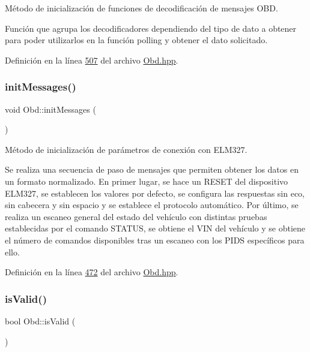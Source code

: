 Método de inicialización de funciones de decodificación de mensajes O\+BD. 

Función que agrupa los decodificadores dependiendo del tipo de dato a obtener para poder utilizarlos en la función polling y obtener el dato solicitado. 

Definición en la línea \hyperlink{Obd_8hpp_source_l00507}{507} del archivo \hyperlink{Obd_8hpp_source}{Obd.\+hpp}.

\mbox{\label{classObd_a5091314ed8068800cce40e7a74a3731e}} 
\subsubsection{\texorpdfstring{init\+Messages()}{initMessages()}}
{\footnotesize\ttfamily void Obd\+::init\+Messages (\begin{DoxyParamCaption}{ }\end{DoxyParamCaption})\hspace{0.3cm}{\ttfamily [inline]}}



Método de inicialización de parámetros de conexión con E\+L\+M327. 

Se realiza una secuencia de paso de mensajes que permiten obtener los datos en un formato normalizado. En primer lugar, se hace un R\+E\+S\+ET del dispositivo E\+L\+M327, se establecen los valores por defecto, se configura las respuestas sin eco, sin cabecera y sin espacio y se establece el protocolo automático. Por último, se realiza un escaneo general del estado del vehículo con distintas pruebas establecidas por el comando S\+T\+A\+T\+US, se obtiene el V\+IN del vehículo y se obtiene el número de comandos disponibles tras un escaneo con los P\+I\+DS específicos para ello. 

Definición en la línea \hyperlink{Obd_8hpp_source_l00472}{472} del archivo \hyperlink{Obd_8hpp_source}{Obd.\+hpp}.

\mbox{\label{classObd_ae28b765bb787467f929eae932133d2aa}} 
\subsubsection{\texorpdfstring{is\+Valid()}{isValid()}}
{\footnotesize\ttfamily bool Obd\+::is\+Valid (\begin{DoxyParamCaption}{ }\end{DoxyParamCaption})\hspace{0.3cm}{\ttfamily [inline]}}




